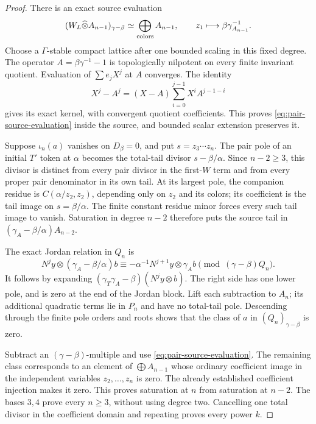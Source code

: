 \begin{proof}
There is an exact source evaluation
\begin{equation}\label{eq:pair-source-evaluation}
 (W_L\widehat\otimes A_{n-1})_{\gamma-\beta}
                  \simeq\bigoplus_{\rm colors}A_{n-1},
                 \qquad z_1\longmapsto\beta\gamma_{A_{n-1}}^{-1}.
\end{equation}
Choose a $\Gamma$-stable compact lattice after one
bounded scaling in this fixed degree. The operator
$A=\beta\gamma^{-1}-1$ is topologically nilpotent on
every finite invariant quotient. Evaluation of
$\sum e_jX^j$ at $A$ converges. The identity
\[
 X^j-A^j=(X-A)\sum_{i=0}^{j-1}X^iA^{j-1-i}
\]
gives its exact kernel, with convergent quotient
coefficients. This proves
\eqref{eq:pair-source-evaluation} inside the source,
and bounded scalar extension preserves it.

Suppose $\iota_n(a)$ vanishes on $D_\beta=0$, and put
$s=z_3\cdots z_n$. The pair pole of an initial $T'$
token at $\alpha$ becomes the total-tail divisor
$s-\beta/\alpha$. Since $n-2\geq3$, this divisor is
distinct from every pair divisor in the first-$W$
term and from every proper pair denominator in its
own tail. At its largest pole, the companion residue
is $C(\alpha/z_2,z_2)$, depending only on $z_2$ and
its colors; its coefficient is the tail image on
$s=\beta/\alpha$. The finite constant residue minor
forces every such tail image to vanish. Saturation
in degree $n-2$ therefore puts the source
tail in $(\gamma_A-\beta/\alpha)A_{n-2}$.

The exact Jordan relation in $Q_n$ is
\begin{equation}\label{eq:pair-Jordan-reduction}
 N^jy\otimes(\gamma_A-\beta/\alpha)b
 \equiv-\alpha^{-1}N^{j+1}y\otimes\gamma_A b
                                  \pmod{(\gamma-\beta)Q_n}.
\end{equation}
It follows by expanding
$(\gamma_T\gamma_A-\beta)(N^jy\otimes b)$.
The right side has one lower pole, and is zero at
the end of the Jordan block. Lift each subtraction
to $A_n$; its additional quadratic terms lie in
$P_n$ and have no total-tail pole. Descending through
the finite pole orders and roots shows that the
class of $a$ in $(Q_n)_{\gamma-\beta}$ is zero.

Subtract an $(\gamma-\beta)$-multiple and use
\eqref{eq:pair-source-evaluation}. The remaining
class corresponds to an element of
$\bigoplus A_{n-1}$ whose ordinary coefficient image
in the independent variables $z_2,\ldots,z_n$ is zero.
The already established coefficient injection makes
it zero. This proves saturation at $n$ from saturation
at $n-2$. The bases $3,4$ prove every $n\geq3$,
without using degree two. Cancelling one total
divisor in the coefficient domain and repeating
proves every power $k$.


\end{proof}
